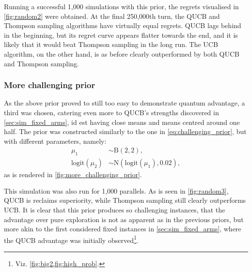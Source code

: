 Running a successful 1,000 simulations with this prior, the regrets visualised in \cref{fig:random2} were obtained.
At the final 250,000th turn, the QUCB and Thompson sampling algorithms have virtually equal regrets.
QUCB lags behind in the beginning, but its regret curve appears flatter towards the end, and it is likely that it would beat Thompson sampling in the long run.
The UCB algorithm, on the other hand, is as before clearly outperformed by both QUCB and Thompson sampling.

\subsubsection{More challenging prior}
As the above prior proved to still too easy to demonstrate quantum advantage, a third was chosen, catering even more to QUCB's strengths discovered in \cref{sec:sim_fixed_arms}, id est having close means and means centred around one half.
The prior was constructed similarly to the one in \cref{eq:challenging_prior}, but with different parameters, namely:
\begin{equation}
    \label{eq:more_challenging_prior}
    \begin{aligned}
        \mu_1               & \sim \text{B}(2, 2),                      \\
        \text{logit}(\mu_2) & \sim \text{N}(\text{logit}(\mu_1), 0.02),
    \end{aligned}
\end{equation}
as is rendered in \cref{fig:more_challenging_prior}.

This simulation was also run for 1,000 parallels.
As is seen in \cref{fig:random3}, QUCB is reclaims superiority, while Thompson sampling still clearly outperforms UCB.
It is clear that this prior produces so challenging instances, that the advantage over pure exploration is not as apparent as in the previous priors, but more akin to the first considered fixed instances in \cref{sec:sim_fixed_arms}, where the QUCB advantage was initially observed\footnote{Viz. \cref{fig:big2,fig:high_prob}.}.


